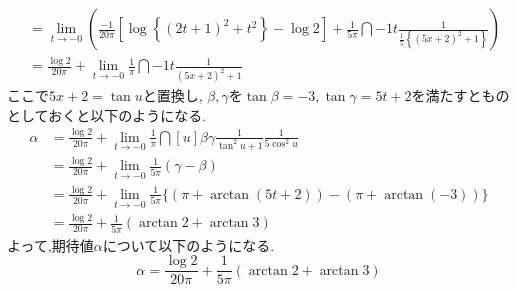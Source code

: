 \documentclass[dvipdfmx,titlepage, 11pt, a4paper]{jsarticle}%
\begin{document}
\begin{enumerate}[(1)]
\begin{align*}
           &= \lim_{t \to -0}\left(\frac{-1}{20\pi}\left[\log\left\{\left(2t + 1\right)^2 + t^2\right\} - \log 2\right] + \frac{1}{5\pi}\dint{-1}{t}{\frac{1}{\frac{1}{5}\left\{\left(5x + 2\right)^2 + 1\right\}}}\right)\\
           &= \frac{\log 2}{20\pi} + \lim_{t \to -0}\frac{1}{\pi}\dint{-1}{t}{\frac{1}{\left(5x + 2\right)^2 + 1}}
  \end{align*}
  ここで$5x + 2 = \tan u$と置換し, $\beta, \gamma$を$\tan\beta = -3, \tan\gamma = 5t + 2$を満たすとものとしておくと以下のようになる.
  \begin{align*}
    \alpha &= \frac{\log 2}{20\pi} + \lim_{t \to -0}\frac{1}{\pi}\dint[u]{\beta}{\gamma}{\frac{1}{\tan^{2}u+ 1}\frac{1}{5\cos^{2}u}}\\
           &= \frac{\log 2}{20\pi} + \lim_{t \to -0}\frac{1}{5\pi}(\gamma - \beta)\\
           &= \frac{\log 2}{20\pi} + \lim_{t \to -0}\frac{1}{5\pi}\bigl\{(\pi + \arctan(5t + 2)) - (\pi + \arctan(-3))\bigr\}\\
           &= \frac{\log 2}{20\pi} + \frac{1}{5\pi}(\arctan 2 + \arctan 3)
  \end{align*}
  よって,期待値$\alpha$について以下のようになる.
  \begin{equation}
    \alpha = \frac{\log 2}{20\pi} + \frac{1}{5\pi}(\arctan 2 + \arctan 3)\label{eq:subsec3:prom4:ans}
  \end{equation}
  \vspace{0.3cm}


\end{enumerate}
\end{document}

